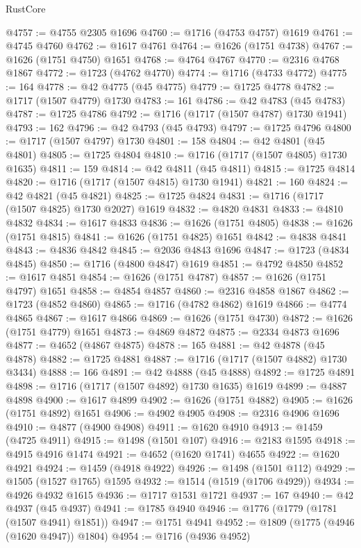 \begin{lexlean}{RustCore}
\begin{coremodule}
@4757 := @4755 @2305 @1696
@4760 := @1716 (@4753 @4757) @1619
@4761 := @4745 @4760
@4762 := @1617 @4761
@4764 := @1626 (@1751 @4738)
@4767 := @1626 (@1751 @4750) @1651
@4768 := @4764 @4767
@4770 := @2316 @4768 @1867
@4772 := @1723 (@4762 @4770)
@4774 := @1716 (@4733 @4772)
@4775 := 164
@4778 := @42 @4775 (@45 @4775)
@4779 := @1725 @4778
@4782 := @1717 (@1507 @4779) @1730
@4783 := 161
@4786 := @42 @4783 (@45 @4783)
@4787 := @1725 @4786
@4792 := @1716 (@1717 (@1507 @4787) @1730 @1941)
@4793 := 162
@4796 := @42 @4793 (@45 @4793)
@4797 := @1725 @4796
@4800 := @1717 (@1507 @4797) @1730
@4801 := 158
@4804 := @42 @4801 (@45 @4801)
@4805 := @1725 @4804
@4810 := @1716 (@1717 (@1507 @4805) @1730 @1635)
@4811 := 159
@4814 := @42 @4811 (@45 @4811)
@4815 := @1725 @4814
@4820 := @1716 (@1717 (@1507 @4815) @1730 @1941)
@4821 := 160
@4824 := @42 @4821 (@45 @4821)
@4825 := @1725 @4824
@4831 := @1716 (@1717 (@1507 @4825) @1730 @2027) @1619
@4832 := @4820 @4831
@4833 := @4810 @4832
@4834 := @1617 @4833
@4836 := @1626 (@1751 @4805)
@4838 := @1626 (@1751 @4815)
@4841 := @1626 (@1751 @4825) @1651
@4842 := @4838 @4841
@4843 := @4836 @4842
@4845 := @2036 @4843 @1696
@4847 := @1723 (@4834 @4845)
@4850 := @1716 (@4800 @4847) @1619
@4851 := @4792 @4850
@4852 := @1617 @4851
@4854 := @1626 (@1751 @4787)
@4857 := @1626 (@1751 @4797) @1651
@4858 := @4854 @4857
@4860 := @2316 @4858 @1867
@4862 := @1723 (@4852 @4860)
@4865 := @1716 (@4782 @4862) @1619
@4866 := @4774 @4865
@4867 := @1617 @4866
@4869 := @1626 (@1751 @4730)
@4872 := @1626 (@1751 @4779) @1651
@4873 := @4869 @4872
@4875 := @2334 @4873 @1696
@4877 := @4652 (@4867 @4875)
@4878 := 165
@4881 := @42 @4878 (@45 @4878)
@4882 := @1725 @4881
@4887 := @1716 (@1717 (@1507 @4882) @1730 @3434)
@4888 := 166
@4891 := @42 @4888 (@45 @4888)
@4892 := @1725 @4891
@4898 := @1716 (@1717 (@1507 @4892) @1730 @1635) @1619
@4899 := @4887 @4898
@4900 := @1617 @4899
@4902 := @1626 (@1751 @4882)
@4905 := @1626 (@1751 @4892) @1651
@4906 := @4902 @4905
@4908 := @2316 @4906 @1696
@4910 := @4877 (@4900 @4908)
@4911 := @1620 @4910
@4913 := @1459 (@4725 @4911)
@4915 := @1498 (@1501 @107)
@4916 := @2183 @1595
@4918 := @4915 @4916 @1474
@4921 := @4652 (@1620 @1741) @4655
@4922 := @1620 @4921
@4924 := @1459 (@4918 @4922)
@4926 := @1498 (@1501 @112)
@4929 := @1505 (@1527 @1765) @1595
@4932 := @1514 (@1519 (@1706 @4929))
@4934 := @4926 @4932 @1615
@4936 := @1717 @1531 @1721
@4937 := 167
@4940 := @42 @4937 (@45 @4937)
@4941 := @1785 @4940
@4946 := @1776 (@1779 (@1781 (@1507 @4941) @1851))
@4947 := @1751 @4941
@4952 := @1809 (@1775 (@4946 (@1620 @4947)) @1804)
@4954 := @1716 (@4936 @4952)

\end{coremodule}
\end{lexlean}

